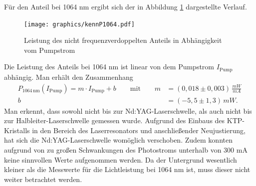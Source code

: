 \documentclass[twoside,colorback,accentcolor=tud4c,11pt]{tudreport}
\begin{document}
Für den Anteil bei 1064 nm ergibt sich der in Abbildung \ref{a_4.4_2} dargestellte Verlauf.
\begin{figure}[H]
\centering
   	\begin{minipage}[b]{0.85\textwidth}
   	\texttt{[image: graphics/kennP1064.pdf]}
  	\label{a_4.4_2}
   	\end{minipage}
\caption{Leistung des nicht frequenzverdoppelten Anteils in Abhängigkeit vom Pumpstrom}	
\end{figure}
Die Leistung des Anteils bei 1064 nm ist linear von dem Pumpstrom $I_{\text{Pump}}$ abhängig. Man erhält den Zusammenhang
\begin{align*}
P_{1064\,\text{nm}}(I_{\text{Pump}})=m\cdot I_{\text{Pump}}+b \qquad \text{mit} \qquad
m&=(0,018\pm0,003)\,\frac{\si{mW}}{\si{mA}}\\
b&=(-5,5\pm1,3) \,\si{mW}.
\end{align*}
Man erkennt, dass sowohl nicht bis zur Nd:YAG-Laserschwelle, als auch nicht bis zur Halbleiter-Laserschwelle gemessen wurde. Aufgrund des Einbaus des KTP-Kristalls in den Bereich des Laserresonators und anschließender Neujustierung, hat sich die Nd:YAG-Laserschwelle womöglich verschoben. Zudem konnten aufgrund von zu großen Schwankungen des Photostroms unterhalb von 300 mA keine sinnvollen Werte aufgenommen werden. Da der Untergrund wesentlich kleiner als die Messwerte für die Lichtleistung bei 1064 nm ist, muss dieser nicht weiter betrachtet werden. \\
\end{document}
